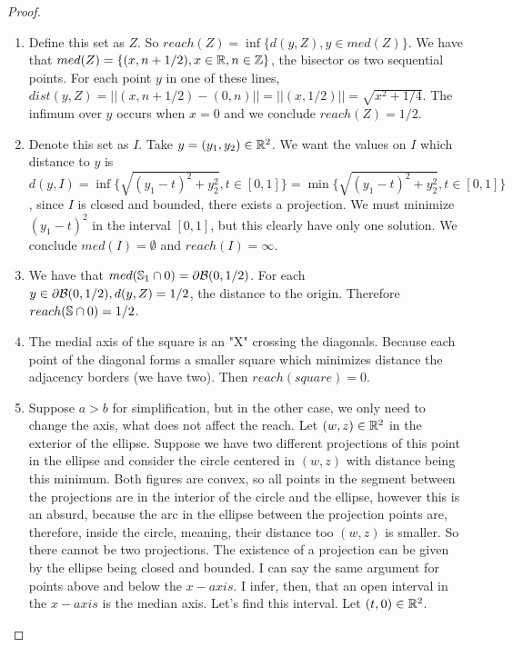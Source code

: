 \begin{proof}

\begin{enumerate}
    \item Define this set as $Z$. So $reach(Z) = \inf\{d(y,Z), y \in
    med(Z)\}$. We have that $med(Z) = \{(x,n+1/2), x \in \mathbb{R}, n \in \mathbb{Z}\}$, the
    bisector os two sequential points. For each point $y$ in one of these
    lines, $dist(y,Z) = ||(x,n+1/2) - (0,n)|| = ||(x,1/2)|| = \sqrt{x^2 +
    1/4}$. The infimum over $y$ occurs when $x = 0$ and we conclude $reach(Z)
    = 1/2$. 

    \item Denote this set as $I$. Take $y = (y_1, y_2) \in \mathbb{R}^2$. We want
    the values on $I$ which distance to $y$ is $d(y,I) = \inf\{\sqrt{(y_1 -
    t)^2 + y_2^2}, t \in [0,1] \} = \min\{\sqrt{(y_1 -
    t)^2 + y_2^2}, t \in [0,1] \}$, since $I$ is closed and bounded, there exists a projection. We must
    minimize $(y_1 - t)^2$ in the interval $[0,1]$, but this clearly have only
    one solution. We conclude $med(I) = \emptyset$ and $reach(I) = \infty$. 
    
    \item We have that $med(\mathbb{S}_1 \cap 0) = \partial\mathcal{B}(0,1/2)$. For each
    $y \in \partial\mathcal{B}(0,1/2), d(y,Z) = 1/2$, the distance to the origin.
    Therefore $reach(\mathbb{S} \cap 0) = 1/2$. 

    \item The medial axis of the square is an "X" crossing the diagonals.
    Because each point of the diagonal forms a smaller square which minimizes
    distance the adjacency borders (we have two). Then $reach(square) = 0$. 

    \item Suppose $a > b$ for simplification, but in the other  case, we only
    need to change the axis, what does not affect the reach. Let $(w,z) \in \mathbb{R}^2$ in the exterior of the ellipse. Suppose we have
    two different projections of this point in the ellipse and consider the
    circle centered in $(w,z)$ with distance being this minimum. Both figures
    are convex, so all points in the segment between the projections are in
    the interior of the circle and the ellipse, however this is an absurd, because
    the arc in the ellipse between the projection points are,
    therefore, inside the circle, meaning, their distance too $(w,z)$ is smaller.
    So there cannot be two projections. The existence of a projection can be
    given by the ellipse being closed and bounded. I can say the same argument
    for points above and below the $x-axis$. I infer, then, that an open
    interval in the $x-axis$ is the median axis. Let's find this interval. Let
    $(t,0) \in \mathbb{R}^2$. 


\end{enumerate}
\end{proof}

